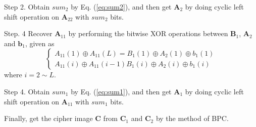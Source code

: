 \documentclass[final,3p,times]{elsarticle}
\begin{document}
\begin{itemize}
	Step 2. Obtain $sum_2$ by Eq. (\ref{eq:sum2}), and then get $\bm{A}_{2}$ by doing cyclic left shift operation on $\bm{A}_22$ with $sum_2$ bits.
	
	
	Step. 4 Recover $\bm{A}_{11}$ by performing the bitwise XOR operations between $\bm{B}_{1}$, $\bm{A}_{2}$ and $\bm{b}_{1}$, given as
	\begin{equation}
	\left\{ \begin{array}{l}
	A_{11}(1) \oplus A_{11}(L) = B_1(1) \oplus A_{2}(1) \oplus b_{1}(1)\\
	A_{11}(i) \oplus A_{11}(i-1) B_1(i) \oplus A_{2}(i) \oplus b_{1}(i)
	\end{array} \right.
	\label{eq:B1_to_A11}
	\end{equation}
	where $i=2 \sim L$.
	
	Step 4. Obtain $sum_1$ by Eq. (\ref{eq:sum1}), and then get $\bm{A}_{1}$ by doing cyclic left shift operation on $\bm{A}_11$ with $sum_1$ bits.
	
	Finally, get the cipher image $\bm{C}$ from $\bm{C}_1$ and $\bm{C}_2$ by the method of BPC.
\end{itemize}
\end{document}
